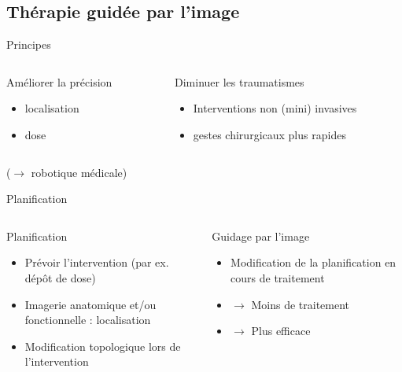 \documentclass{beamer}
\begin{document}
\subsection{Thérapie guidée par l'image}
\begin{frame}{Principes}
\centering
  \begin{columns}[t]
 \begin{column}{0.5\textwidth}
\begin{block}{Améliorer la précision}
\begin{itemize}
  \item localisation
  \item dose
 \end{itemize}
\end{block}
 \end{column}
 \begin{column}{0.5\textwidth}
\begin{block}{Diminuer les traumatismes}
\begin{itemize}
  \item Interventions non (mini) invasives
  \item gestes chirurgicaux plus rapides
  \end{itemize}
\end{block}
\end{column}
\end{columns}
  \item (\small$\rightarrow$ robotique médicale)
\end{frame}
\begin{frame}{Planification}
 \centering
  \begin{columns}[t]
 \begin{column}{0.5\textwidth}
\begin{block}{Planification}
\begin{itemize}
 \item Prévoir l'intervention (par ex. dépôt de dose)
 \item Imagerie anatomique et/ou fonctionnelle : localisation
 \item Modification topologique lors de l'intervention
\end{itemize}\end{block}
 \end{column}
 \begin{column}{0.5\textwidth}
\begin{block}{Guidage par l'image}
\begin{itemize}
  \item Modification de la planification en cours de traitement
  \item $\rightarrow$ Moins de traitement
  \item $\rightarrow$ Plus efficace
  \end{itemize}
\end{block}
\end{column}
\end{columns}
\end{frame}
\end{document}
